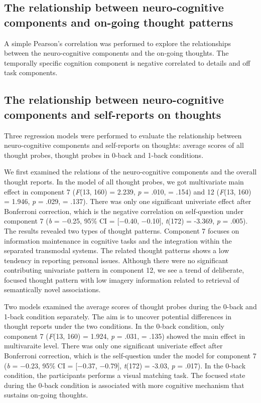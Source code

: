 \subsection{The relationship between neuro-cognitive components and on-going thought patterns}
A simple Pearson’s correlation was performed to explore the relationships between the neuro-cognitive components and the on-going thoughts. The temporally specific cognition component is negative correlated to details and off task components. 




\subsection{The relationship between neuro-cognitive components and self-reports on thoughts}

Three regression models were performed to evaluate the relationship between neuro-cognitive components and self-reports on thoughts: average scores of all thought probes, thought probes in 0-back and 1-back conditions. 

We first examined the relations of the neuro-cognitive components and the overall thought reports. In the model of all thought probes, we got multivariate main effect in component 7 (\textit{F}(13, 160) = 2.239, \textit{p} = .010, \paretasquared = .154)
and 12 (\textit{F}(13, 160) = 1.946, \textit{p} = .029, \paretasquared = .137). There was only one significant univeriate effect after Bonferroni correction, which is the negative correlation on self-question under component 7 
(\textit{b} = −0.25, 95\% CI = [−0.40, −0.10], \textit{t}(172) = -3.369, \textit{p} = .005). The results revealed two types of thought patterns. Component 7 focuses on information maintenance in cognitive tasks and the integration within the separated transmodal systems. The related thought patterns shows a low tendency in reporting personal issues. Although there were no significant contributing univariate pattern in component 12, we see a trend of deliberate, focused thought pattern with low imagery information related to retrieval of semantically novel associations.

Two models examined the average scores of thought probes during the 0-back and 1-back condition separately.  The aim is to uncover potential differences in thought reports under the two conditions. In the 0-back condition, only component 7
(\textit{F}(13, 160) = 1.924, \textit{p} = .031, \paretasquared = .135)
showed the main effect in multivaraite level. There was only one significant univeriate effect after Bonferroni correction, which is the self-question under the model for component 7 
(\textit{b} = −0.23, 95\% CI = [−0.37, −0.79], \textit{t}(172) = -3.03, \textit{p} = .017).
In the 0-back condition, the participants performs a visual matching task. The focused state during the 0-back condition is associated with more cognitive mechanism that sustains on-going thoughts. 


